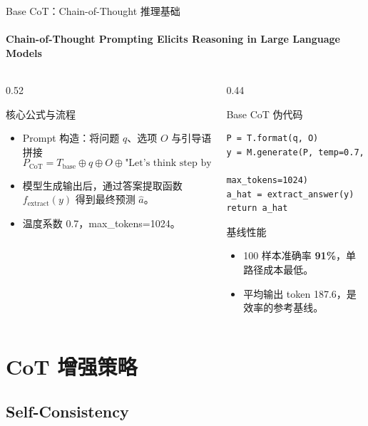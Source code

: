 \documentclass[10pt,aspectratio=169]{beamer}
\newcommand{\tightitems}{\setlength{\itemsep}{0.24em}}
\begin{document}
\begin{frame}[fragile]{Base CoT：Chain-of-Thought 推理基础}
  \framesubtitle{Chain-of-Thought Prompting Elicits Reasoning in Large Language Models}
  \begin{columns}[T,onlytextwidth]
    \begin{column}{0.52\textwidth}
      \begin{block}{核心公式与流程}
        \begin{itemize}
          \tightitems
          \item Prompt 构造：将问题 $q$、选项 $O$ 与引导语拼接
          \[
            P_{\text{CoT}} = T_{\text{base}} \oplus q \oplus O \oplus \text{"Let's think step by step."}
          \]
          \item 模型生成输出后，通过答案提取函数 $f_{\text{extract}}(y)$ 得到最终预测 $\hat{a}$。
          \item 温度系数 0.7，max\_tokens=1024。
        \end{itemize}
      \end{block}
    \end{column}
    \begin{column}{0.44\textwidth}
      \begin{block}{Base CoT 伪代码}
        \scriptsize
\begin{verbatim}
P = T.format(q, O)
y = M.generate(P, temp=0.7,
               max_tokens=1024)
a_hat = extract_answer(y)
return a_hat
\end{verbatim}
      \end{block}
      \begin{alertblock}{基线性能}
        \begin{itemize}
          \tightitems
          \item 100 样本准确率 \textbf{91\%}，单路径成本最低。
          \item 平均输出 token 187.6，是效率的参考基线。
        \end{itemize}
      \end{alertblock}
    \end{column}
  \end{columns}
\end{frame}

\section{CoT 增强策略}
\subsection{Self-Consistency}
\end{document}
